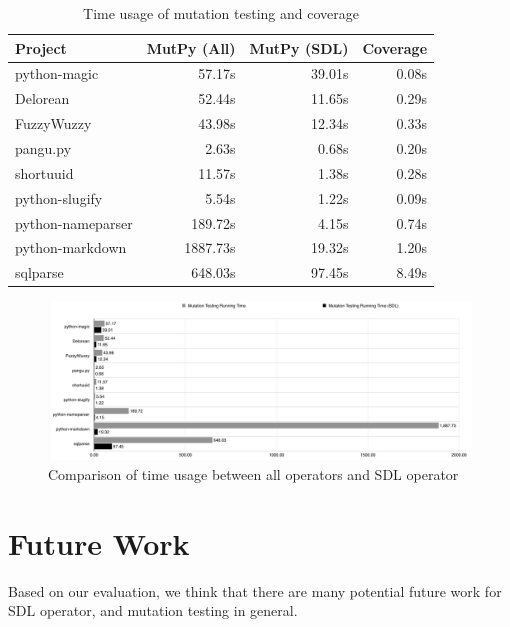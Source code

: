 \documentclass[12pt]{article}
\begin{document}
\begin{table}[H]
\begin{center}
\caption{Time usage of mutation testing and coverage}
\label{table:time}
\begin{tabular}{|l|r|r|r|}
\hline
{\bf Project} & {\bf MutPy (All)} & {\bf MutPy (SDL)} & {\bf Coverage} \\
\hline
python-magic      &   57.17s & 39.01s & 0.08s \\
Delorean          &   52.44s & 11.65s & 0.29s \\
FuzzyWuzzy        &   43.98s & 12.34s & 0.33s \\
pangu.py          &    2.63s &  0.68s & 0.20s \\
shortuuid         &   11.57s &  1.38s & 0.28s \\
python-slugify    &    5.54s &  1.22s & 0.09s \\
python-nameparser &  189.72s &  4.15s & 0.74s \\
python-markdown   & 1887.73s & 19.32s & 1.20s \\
sqlparse          &  648.03s & 97.45s & 8.49s \\
\hline
\end{tabular}
\end{center}
\end{table}

\begin{figure}[H]
\begin{center}
\caption{Comparison of time usage between all operators and SDL operator}
\label{fig:time}
\includegraphics[width=15cm]{time}
\end{center}
\end{figure}

\section{Future Work}

Based on our evaluation, we think that there are many potential future work for SDL operator, and mutation testing in general.
\end{document}
